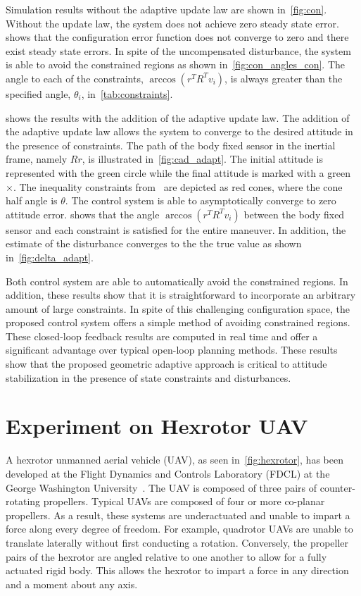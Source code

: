 \documentclass[fleqn]{IJCAS}  %
\begin{document}
\begin{multicols}{2}
Simulation results without the adaptive update law are shown in~\cref{fig:con}.
Without the update law, the system does not achieve zero steady state error. 
 shows that the configuration error function does not converge to zero and there exist steady state errors.
In spite of the uncompensated disturbance, the system is able to avoid the constrained regions as shown in~\cref{fig:con_angles_con}.
The angle to each of the constraints,  \( \arccos(r^T R^T v_i) \), is always greater than the specified angle, \( \theta_i \), in~\cref{tab:constraints}.

 shows the results with the addition of the adaptive update law.
The addition of the adaptive update law allows the system to converge to the desired attitude in the presence of constraints.
The path of the body fixed sensor in the inertial frame, namely \( R r \), is illustrated in~\cref{fig:cad_adapt}.
The initial attitude is represented with the green circle while the final attitude is marked with a green \(\times\).
The inequality constraints from~ are depicted as red cones, where the cone half angle is \( \theta \).
The control system is able to asymptotically converge to zero attitude error.
 shows that the angle \( \arccos(r^T R^T v_i) \) between the body fixed sensor and each constraint is satisfied for the entire maneuver.
In addition, the estimate of the disturbance converges to the the true value as shown in~\cref{fig:delta_adapt}.

Both control system are able to automatically avoid the constrained regions. 
In addition, these results show that it is straightforward to incorporate an arbitrary amount of large constraints.
In spite of this challenging configuration space, the proposed control system offers a simple method of avoiding constrained regions.
These closed-loop feedback results are computed in real time and offer a significant advantage over typical open-loop planning methods.
These results show that the proposed geometric adaptive approach is critical to attitude stabilization in the presence of state constraints and disturbances.

\section{Experiment on Hexrotor UAV}

A hexrotor unmanned aerial vehicle (UAV), as seen in~\cref{fig:hexrotor}, has been developed at the Flight Dynamics and Controls Laboratory (FDCL) at the George Washington University~\cite{kaufman2014}.
The UAV is composed of three pairs of counter-rotating propellers. 
Typical UAVs are composed of four or more co-planar propellers.
As a result, these systems are underactuated and unable to impart a force along every degree of freedom.
For example, quadrotor UAVs are unable to translate laterally without first conducting a rotation.
Conversely, the propeller pairs of the hexrotor are angled relative to one another to allow for a fully actuated rigid body.
This allows the hexrotor to impart a force in any direction and a moment about any axis. 


\end{multicols}
\end{document}
